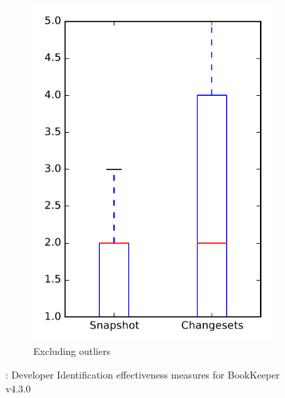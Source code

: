 \begin{figure}
\begin{subfigure}{.4\textwidth}
        \includegraphics[height=0.4\textheight]{figures/dit/rq1_bookkeeper_no_outlier}
        \caption{Excluding outliers}\label{fig:dit:rq1:bookkeeper_no_outlier}
    \end{subfigure}
\caption{\done: Developer Identification effectiveness measures for BookKeeper v4.3.0}
\label{fig:dit:rq1:bookkeeper}
\end{figure}

